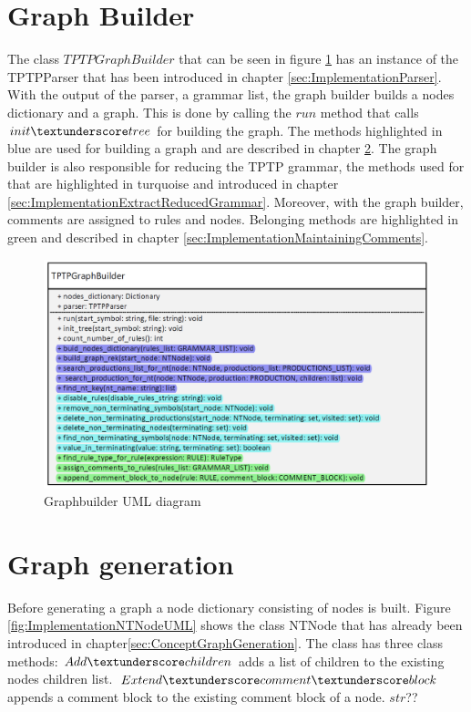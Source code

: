 \section{Graph Builder}\label{sec:ImplementationGraphBuilder}

The class $TPTPGraphBuilder$ that can be seen in figure \ref{fig:ImplementationGraphbuilderUML} has an instance of the TPTPParser that has been introduced in chapter \ref{sec:ImplementationParser}. With the output of the parser, a grammar list, the graph builder builds a nodes dictionary and a graph. This is done by calling the $run$ method that calls $init\textunderscore tree$ for building the graph.
The methods highlighted in blue are used for building a graph and are described in chapter \ref{sec:ImplementationGraphGeneration}. The graph builder is also responsible for reducing the \ac{TPTP} grammar, the methods used for that are highlighted in turquoise and introduced in chapter \ref{sec:ImplementationExtractReducedGrammar}. Moreover, with the graph builder, comments are assigned to rules and nodes. Belonging methods are highlighted in green and described in chapter \ref{sec:ImplementationMaintainingComments}.

\begin{figure}[H]
\centering
\includegraphics[width=1 \textwidth]{images/uml_graphbuilder.png}
\caption{Graphbuilder UML diagram}
\label{fig:ImplementationGraphbuilderUML}
\end{figure}                
                
\section{Graph generation}\label{sec:ImplementationGraphGeneration}

Before generating a graph a node dictionary consisting of nodes is built. Figure \ref{fig:ImplementationNTNodeUML} shows the class NTNode that has already been introduced in chapter\ref{sec:ConceptGraphGeneration}. The class has three class methods:
$Add\textunderscore children$ adds a list of children to the existing nodes children list. $Extend\textunderscore comment\textunderscore block$ appends a comment block to the existing comment block of a node. $str$?? 

